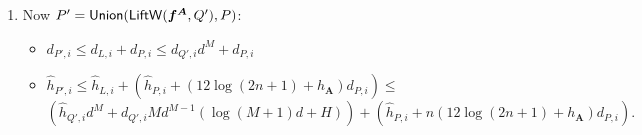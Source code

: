 \documentclass[12pt]{article}
\def\mA{{\bm A}}
\newcommand{\ZZ}{{\mathbb{Z}}}
\def\C{\mathbb{C}}
\def\P{\mathbb{P}}
\def\LiftWL{{\sf LiftW}}
\def\Union{{\sf Union}}
\def\mA{{\bm A}}
\def\C{\mathbb{C}}
\def\P{\mathbb{P}}
\begin{document}
\begin{itemize}
\begin{enumerate}
        
Let $S'$ denote the projective closure of $Q'$. We obtain a cylinder containing the points $Q'$ by taking the ruled join of $S'$ and $\P_{\C}^{M-e-1}$. Consider the class of $S':$ 
%
\begin{equation}\label{eq:cylCanny}
    [S']_{\ZZ} = \hat{h}_{Q',i}\eta \theta^{e-1} + d_{Q',i} \theta^e \in \mathbb{R}[\eta,\theta]/(\eta^2,\theta^{e+1}).
\end{equation}
%
The ruled join of $S'$ and $\P^{M-e-1}$ is the projective variety \[S' \# \P_{\C}^{M-e-1} \subset \P_{\C}^{e + (M-e-1) +1}
=
\P_{\C}^M,\] 
which has degree 
%
\[
\deg (S' \# \P_{\C}^{M-e-1}) = \deg( S') \cdot \deg (\P_{\C}^{M-e-1})= d_{Q',i} \cdot 1 = d_{Q',i}.
\] 
%
%
By Property (2) from \ref{sec:CanonicalH}, in System (\ref{eq:LW2}), each equation defines a hypersurface whose class is, entrywise, at most  
%
\[
(\log(M+1)d + H)\eta + d\theta.
\]
%
By Property (3) from \ref{sec:CanonicalH}, the intersection of $Q'$ with the equations defining (\ref{eq:LW2}) obtains entriwise height bounds as follows.   
%
\begin{align*}
    &[S']_{\ZZ}\cdot ((\log(M+1)d + H)\eta + d\theta)^{M}
    \\
    &\equiv(\hat{h}_{Q',i}\eta \theta^{e-1} + d_{Q',i} \theta^e) \cdot \left( Md^{M-1}((\log(M+1)d + H))\eta \theta^{M-1} + d^{M} \theta^{M}\right) \\
    &\mod (\eta^2,\theta^{M+1})) \\
    &\equiv \left(\hat{h}_{Q',i}d^{M} + d_{Q',i} Md^{M-1}(\log(M+1)d + H)\right)\eta \theta^{(M+e)-1} + d_{Q',i} d^{M} \theta^{(M+e)} \\
    &\mod (\eta^2,\theta^{(M+e)+1}),
\end{align*}
and therefore



    \begin{itemize}
        \item $d_{L,i} \leq d_{Q',i}d^{M}$
        \item $\hat{h}_{L,i} \leq \left(\hat{h}_{Q',i}d^{M} + d_{Q',i} Md^{M-1}(\log(M+1)d + H)\right)$.
    \end{itemize}

    \item Now $P' = \Union ( \LiftWL(\bm f^{\mA}, Q'),P)$:
        \begin{itemize}
            \item $d_{P',i} \leq d_{L,i}+d_{P,i} \leq d_{Q',i}d^{M} + d_{P,i}$
            \item $\hat{h}_{P',i} \leq \hat{h}_{L,i}+ (\hat{h}_{P,i}+(12\log(2n+1)+h_{\mA})d_{P,i}) \leq $
            \[
            \left(\hat{h}_{Q',i}d^{M} + d_{Q',i} Md^{M-1}(\log(M+1)d + H)\right) + (\hat{h}_{P,i}+n(12\log(2n+1)+h_{\mA})d_{P,i}).
            \]
        \end{itemize}


\end{enumerate}
\end{itemize}
\end{document}
